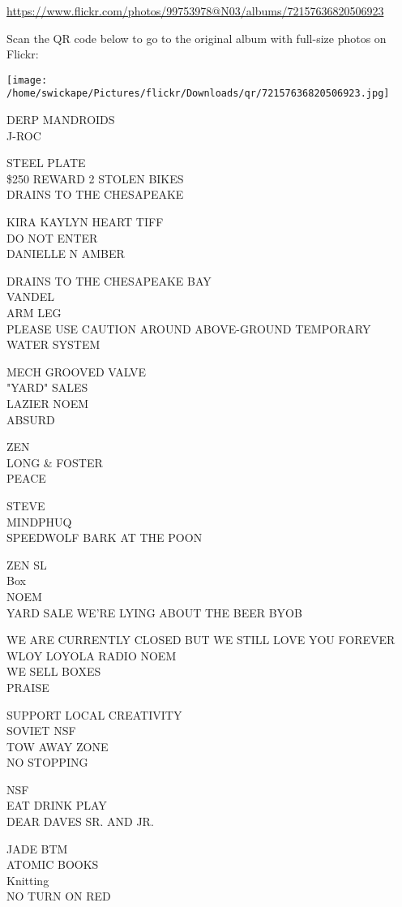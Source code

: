 \documentclass[10pt,letterpaper]{article}
\begin{document}
\url{https://www.flickr.com/photos/99753978@N03/albums/72157636820506923}

Scan the QR code below to go to the original album with full-size photos on Flickr:

\texttt{[image: /home/swickape/Pictures/flickr/Downloads/qr/72157636820506923.jpg]}


DERP MANDROIDS\\
J{-}ROC

STEEL PLATE\\
\$250 REWARD 2 STOLEN BIKES\\
DRAINS TO THE CHESAPEAKE

KIRA KAYLYN HEART TIFF\\
DO NOT ENTER\\
DANIELLE N AMBER

DRAINS TO THE CHESAPEAKE BAY\\
VANDEL\\
ARM LEG\\
PLEASE USE CAUTION AROUND ABOVE{-}GROUND TEMPORARY WATER SYSTEM

MECH GROOVED VALVE\\
"YARD" SALES\\
LAZIER NOEM\\
ABSURD

ZEN\\
LONG \& FOSTER\\
PEACE

STEVE\\
MINDPHUQ\\
SPEEDWOLF BARK AT THE POON

ZEN SL\\
Box\\
NOEM\\
YARD SALE WE'RE LYING ABOUT THE BEER BYOB

WE ARE CURRENTLY CLOSED BUT WE STILL LOVE YOU FOREVER\\
WLOY LOYOLA RADIO NOEM\\
WE SELL BOXES\\
PRAISE

SUPPORT LOCAL CREATIVITY\\
SOVIET NSF\\
TOW AWAY ZONE\\
NO STOPPING

NSF\\
EAT DRINK PLAY\\
DEAR DAVES SR. AND JR.

JADE BTM\\
ATOMIC BOOKS\\
Knitting\\
NO TURN ON RED
\end{document}
